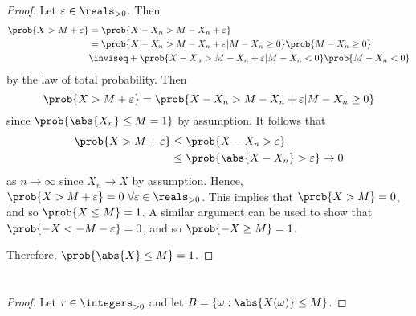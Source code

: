 \documentclass[%
  hwnumber=8,%
  studentnumber=20053722,%
  {name=Bryan Hoang}%
]{%
  mthe353answer%
}
\begin{document}
  \begin{questions}
    \setcounter{question}{0}
    \question{}
    \begin{parts}
      \part{}\label{part:a}
      \begin{solution}
        \begin{proof}
          Let \(\varepsilon \in \reals_{> 0}\). Then
          \begin{align*}
            \prob{X > M + \varepsilon} &= \prob{X - X_n > M - X_n + \varepsilon}\\
            &= \prob{X - X_n > M - X_n + \varepsilon | M - X_n \ge 0} \prob{M - X_n \ge 0}\\
            &\inviseq  + \prob{X - X_n > M - X_n + \varepsilon | M - X_n < 0} \prob{M - X_n < 0}
          \end{align*}
          by the law of total probability. Then
          \begin{equation*}
            \prob{X > M + \varepsilon} = \prob{X - X_n > M - X_n + \varepsilon | M - X_n \ge 0}
          \end{equation*}
          since \(\prob{\abs{X_n} \le M = 1}\) by assumption. It follows that
          \begin{align*}
            \prob{X > M + \varepsilon} &\le \prob{X - X_n > \varepsilon}\\
            &\le \prob{\abs{X - X_n} > \varepsilon} \to 0
          \end{align*}
          as \(n \to \infty\) since \(X_n \to X\) by assumption. Hence,
          \(\prob{X>M+\varepsilon} = 0\ \forall \varepsilon \in \reals_{>0}\).
          This implies that \(\prob{X>M}=0\), and so \(\prob{X \le M}=1\). A similar
          argument can be used to show that \(\prob{-X < -M - \varepsilon} = 0\), and so
          \(\prob{-X \ge M} = 1\).

          Therefore, \(\prob{\abs{X} \le M} = 1\).
        \end{proof}
      \end{solution}
      \part{}
      \begin{solution}
        \begin{proof}
          Let \(r \in \integers_{>0}\) and let \(B=\{\omega : \abs{X(\omega)} \le M\}\).


\end{proof}
\end{solution}
\end{parts}
\end{questions}
\end{document}
